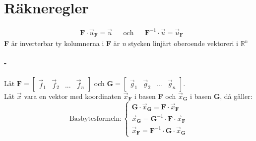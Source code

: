 \section{Räkneregler} %
\label{sec:r_kneregler}
\begin{align*}
&\mathbf{F} \cdot \vec{u}_{\mathbf{F}} = \vec{u}
&&\mbox{och}
&&\mathbf{F}^{-1} \cdot \vec{u} = \vec{u}_\mathbf{F}
\end{align*}
\textbf{F} är inverterbar ty kolumnerna i \textbf{F} är \textit{n} stycken linjärt oberoende vektoreri i $\mathbb{R}^n$
\paragraph{-} %
\label{par:_2}
Låt $\mathbf{F} = \begin{bmatrix} \vec{f}_1 & \vec{f}_2 & ... & \vec{f}_n \end{bmatrix}$ och $\mathbf{G} = \begin{bmatrix} \vec{g}_1 & \vec{g}_2 & ... & \vec{g}_n \end{bmatrix}$.\\
Låt $\vec{x}$ vara en vektor med koordinaten $\vec{x}_\mathbf{F}$ i basen \textbf{F} och $\vec{x}_\mathbf{G}$ i basen \textbf{G}, då gäller:
\[
\text{Basbytesformeln}: 
\begin{cases}
	\mathbf{G} \cdot \vec{x}_{\mathbf{G}} = \mathbf{F} \cdot \vec{x}_\mathbf{F}\\
	\vec{x}_{\mathbf{G}} = \mathbf{G}^{-1} \cdot \mathbf{F} \cdot \vec{x}_{\mathbf{F}}\\
	\vec{x}_{\mathbf{F}} = \mathbf{F}^{-1} \cdot \mathbf{G} \cdot \vec{x}_{\mathbf{G}}
\end{cases}
\]
